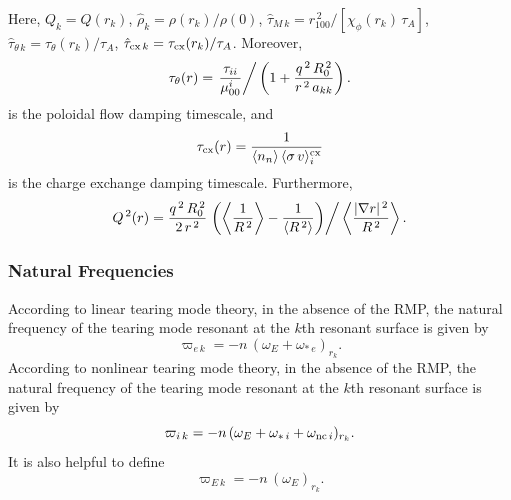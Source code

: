 \documentclass[12pt,prb,aps]{revtex4-1}
\begin{document}
Here, $Q_k = Q(r_k)$, $\hat{\rho}_k=\rho(r_k)/\rho(0)$, $\hat{\tau}_{M\,k}= r_{100}^{\,2}/[\chi_\phi(r_k)\,\tau_A]$,  $\hat{\tau}_{\theta\,k}=\tau_\theta(r_k)/\tau_A$, $\hat{\tau}_{{\rm cx}\,k} =\tau_{{\rm cx}}(r_k)/\tau_A$. 
Moreover, 
\begin{equation}\label{a70}
\tau_\theta(r) = \left. \frac{\tau_{ii}}{\mu_{00}^i}\right/\left(1+\frac{q^{\,2}\,R_0^{\,2}}{r^{\,2}\,a_{kk}}\right).
\end{equation}
is the poloidal flow damping timescale, 
and
\begin{equation}
\tau_{\rm cx}(r)=\frac{1}{\langle n_n\rangle\,\langle \sigma\,v\rangle_i^{\rm cx}}
\end{equation}
is the charge exchange damping timescale. 
Furthermore,
\begin{equation}\label{a71}
Q^{\,2}(r) =\frac{q^{\,2}\,R_0^{\,2}}{2\,r^{\,2}}\left.\left(\left\langle\frac{1}{R^{\,2}}\right\rangle-\frac{1}{\langle R^{\,2}\rangle}\right)\right/\left\langle \frac{|\nabla r|^{\,2}}{R^{\,2}}\right\rangle.
\end{equation}

\subsubsection{Natural Frequencies}\label{snat}
According to linear tearing mode theory, in the absence of the RMP, the natural frequency of the tearing mode resonant at the $k$th resonant surface is given by
\begin{equation}\label{elin}
 \varpi_{e\,k} = - n\,(\omega_E+\omega_{\ast\,e})_{r_k}.
\end{equation}
According to nonlinear tearing mode theory, in the absence of the RMP, 
the natural frequency of the tearing mode resonant at the $k$th resonant surface is given by
\begin{equation}\label{e28y}
 \varpi_{i\,k}=  -n\,(\omega_E+\omega_{\ast\,i}+\omega_{{\rm nc}\,i})_{r_k}.
 \end{equation}
 It is also helpful to define
 \begin{equation}
 \varpi_{E\,k}=  -n\,(\omega_E)_{r_k}.
 \end{equation}
\end{document}
